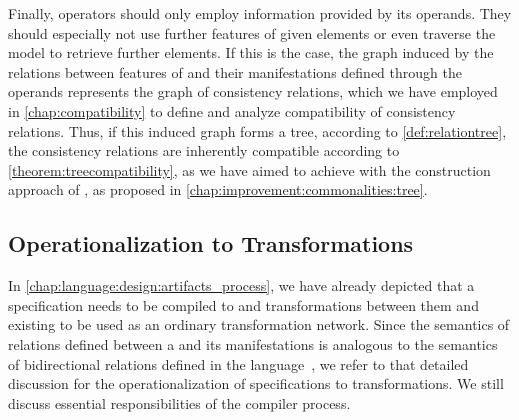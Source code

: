 Finally, operators should only employ information provided by its operands.
They should especially not use further features of given elements or even traverse the model to retrieve further elements.
If this is the case, the graph induced by the relations between features of \commonalities and their manifestations defined through the operands represents the graph of consistency relations, which we have employed in \autoref{chap:compatibility} to define and analyze compatibility of consistency relations.
Thus, if this induced graph forms a tree, according to \autoref{def:relationtree}, the consistency relations are inherently compatible according to \autoref{theorem:treecompatibility}, as we have aimed to achieve with the construction approach of \commonalities, as proposed in \autoref{chap:improvement:commonalities:tree}.


\subsection{Operationalization to Transformations}
\label{chap:language:commonalities:operationalization}

In \autoref{chap:language:design:artifacts_process}, we have already depicted that a \commonalities specification needs to be compiled to \conceptmetamodels and transformations between them and existing \concretemetamodels to be used as an ordinary transformation network.
Since the semantics of relations defined between a \commonality and its manifestations is analogous to the semantics of bidirectional relations defined in the \mappings language~\cite[Chap. 7]{kramer2017a}, we refer to that detailed discussion for the operationalization of \commonalities specifications to transformations.
We still discuss essential responsibilities of the compiler process.

